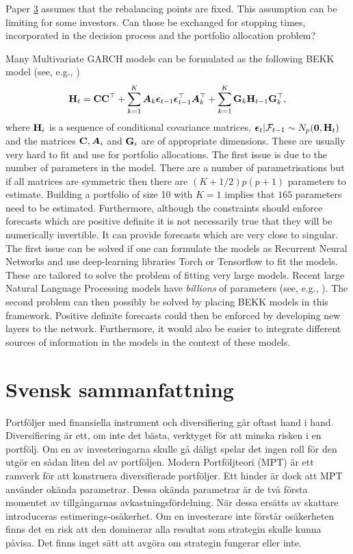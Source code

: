 \documentclass[12pt, oneside]{book}\usepackage{knitr}
\begin{document}
{Paper \hyperref[sec:paper3]{3} assumes that the rebalancing points are fixed.
This assumption can be limiting for some investors.
Can those be exchanged for stopping times, incorporated in the decision process and the portfolio allocation problem?

Many Multivariate GARCH models can be formulated as the following BEKK model (see, e.g., \citet{engle1995multivariate})
\begin{equation}\label{eqn:BEKK}
  \mathbf{H}_t = \mathbf{C} \mathbf{C}^\top + \sum_{k=1}^K \mbox{\boldmath$A$}_k \boldsymbol{\epsilon}_{t-1}\boldsymbol{\epsilon}_{t-1}^\top \mbox{\boldmath$A$}_k^\top + \sum_{k=1}^K \mathbf{G}_k \mathbf{H}_{t-1}\mathbf{G}_k^\top,
\end{equation}
where $\mathbf{H}_i$ is a sequence of conditional covariance matrices, $\boldsymbol{\epsilon}_t | \mathcal{F}_{t-1} \sim N_p(\mathbf{0}, \mathbf{H}_t)$ and the matrices $\mathbf{C}, \mbox{\boldmath$A$}_i$ and $\mathbf{G}_i$ are of appropriate dimensions.
These are usually very hard to fit and use for portfolio allocations. 
The first issue is due to the number of parameters in the model.
There are a number of parametrisations but if all matrices are symmetric then there are $(K+1/2)p(p+1)$ parameters to estimate. 
Building a portfolio of size 10 with $K=1$ implies that $165$ parameters need to be estimated.
Furthermore, although the constraints should enforce forecasts which are positive definite it is not necessarily true that they will be numerically invertible.
It can provide forecasts which are very close to singular.
The first issue can be solved if one can formulate the models as Recurrent Neural Networks and use deep-learning libraries Torch or Tensorflow to fit the models. 
These are tailored to solve the problem of fitting very large models.
Recent large Natural Language Processing models have \textit{billions} of parameters (see, e.g., \citet{brown2020language}). 
The second problem can then possibly be solved by placing BEKK models in this framework.
Positive definite forecasts could then be enforced by developing new layers to the network. 
Furthermore, it would also be easier to integrate different sources of information in the models in the context of these models.

\chapter{Svensk sammanfattning}

Portföljer med finansiella instrument och diversifiering går oftast hand i hand.
Diversifiering är ett, om inte det bästa, verktyget för att minska risken i en portfölj.
Om en av investeringarna skulle gå dåligt spelar det ingen roll för den utgör en sådan liten del av portföljen.
Modern Portföljteori (MPT) är ett ramverk för att konstruera diversifierade portföljer.
Ett hinder är dock att MPT använder okända parametrar.
Dessa okända parametrar är de två första momentet av tillgångarnas avkastningsfördelning.
När dessa ersätts av skattare introduceras estimerings-osäkerhet.
Om en investerare inte förstår osäkerheten finns det en risk att den dominerar alla resultat som strategin skulle kunna påvisa.
Det finns inget sätt att avgöra om strategin fungerar eller inte.

}
\end{document}
